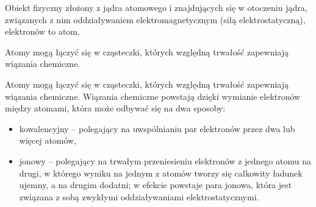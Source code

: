 Obiekt fizyczny złożony z jądra atomowego i znajdujących się w otoczeniu jądra, związanych z nim oddziaływaniem elektromagnetycznym (siłą elektrostatyczną), elektronów to atom. 

Atomy mogą łączyć się w cząsteczki, których względną trwałość zapewniają wiązania chemiczne.

Atomy mogą łączyć się w cząsteczki, których względną trwałość zapewniają wiązania chemiczne. Wiązania chemiczne powstają dzięki wymianie elektronów między atomami, która może odbywać się na dwa sposoby:
\begin{itemize}
	\item kowalencyjny – polegający na uwspólnianiu par elektronów przez dwa lub więcej atomów,
	\item jonowy – polegający na trwałym przeniesieniu elektronów z jednego atomu na drugi, w którego wyniku na jednym z atomów tworzy się całkowity ładunek ujemny, a na drugim dodatni; w efekcie powstaje para jonowa, która jest związana z sobą zwykłymi oddziaływaniami elektrostatycznymi.
\end{itemize}